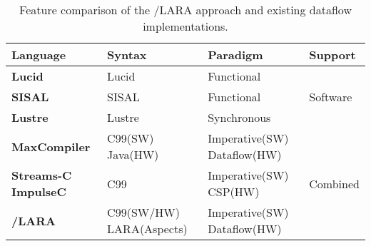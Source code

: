 \begin{table}[!ht]
  \renewcommand{\arraystretch}{2.1}
  \centering
  \label{table:feature-comparison}
  \begin{tabularx}{\textwidth}{ X | p{2.5cm} | p{3cm} | p{1.9cm} }
    \hline
    \bf{Language}                 & \bf{Syntax}              & \bf{Paradigm}               & \bf{Support}              \\
    \hline \hline
    \bf{Lucid}                    & Lucid                    & Functional                  & \multirow{3}{*}{Software} \\
    \cline{1-3}
    \bf{SISAL}                    & SISAL                    & Functional                  &                           \\
    \cline{1-3}
    \bf{Lustre}                   & Lustre                   & Synchronous                 &                           \\
    \bf{MaxCompiler}              & C99(SW) Java(HW)         & Imperative(SW) Dataflow(HW) & \multirow{3}{*}{Combined} \\
    \bf{Streams-C} \bf{ImpulseC}\ & C99                      & Imperative(SW) CSP(HW)      &                           \\
    \bf{\FAST{}}/\bf{LARA}        & C99(SW/HW) LARA(Aspects) & Imperative(SW) Dataflow(HW) &                           \\
  \end{tabularx}
  \caption{Feature comparison of the \FAST{}/LARA approach and existing dataflow implementations.}
\end{table}



